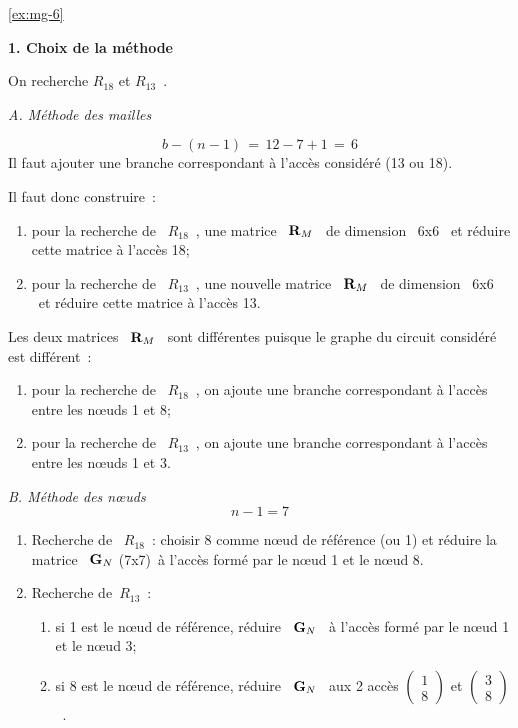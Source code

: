 \begin{solexercise}{\ref{ex:mg-6}}
	\label{solex:mg-6}

{\bf 1. Choix de la méthode} \ 

On recherche  $R_{18}$ et $R_{13}$~.

{\em A. Méthode des mailles}

\[ b-(n-1) \, = \, 12-7+1 \, = \, 6 \]
Il faut ajouter une branche correspondant à l'accès considéré (13 ou 18).

Il faut donc construire~:
\begin{enumerate}
	\item pour la recherche de \ $R_{18}$~, une matrice \ ${\bf R}_M$ \ de
	dimension \ $6$x$6$ \ et réduire cette matrice à l'accès 18;
	\item pour la recherche de \ $R_{13}$~, une nouvelle matrice \ ${\bf
		R}_M$ \ de dimension \ $6$x$6$ \ et réduire cette matrice à l'accès
	13.
\end{enumerate}

Les deux matrices \ ${\bf R}_M$ \ sont différentes puisque le graphe
du circuit considéré est différent~:
\begin{enumerate}
	\item pour la recherche de \ $R_{18}$~, on ajoute une branche
	correspondant à l'accès entre les nœuds 1 et 8;
	\item pour la recherche de \ $R_{13}$~, on ajoute une branche
	correspondant à l'accès entre les nœuds 1 et 3.
\end{enumerate}

{\em B. Méthode des nœuds}
\[n-1=7\]
\begin{enumerate}
	\item Recherche de \ $R_{18}$~: choisir 8 comme nœud de référence (ou
	1) et réduire la matrice \ ${\bf G}_N$ (7x7)\ à l'accès formé par le
	nœud 1 et le nœud 8.
	\item Recherche de\  $R_{13}$~: 
	\begin{enumerate}
		\item si 1 est le nœud de référence, réduire \ ${\bf G}_N$ \ à
		l'accès formé par le nœud 1 et le nœud 3;
		\item si 8 est le nœud de référence, réduire \ ${\bf G}_N$ \ aux 2
		accès $ \left( \begin{array}{c} 1\\ 8 \end{array} \right)$ et $ \left(
		\begin{array}{c} 3\\ 8 \end{array} \right)$~.
		

\end{enumerate}
\end{enumerate}
\end{solexercise}
